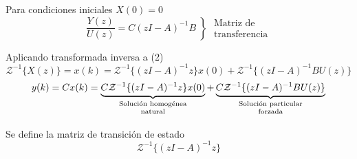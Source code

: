 Para condiciones iniciales \( X(0) = 0 \)
\[
    \frac{Y(z)}{U(z)} = C(zI-A)^{-1}B 
    \left\}
            \begin{array}{lll}
                \text{Matriz de} \\
                \text{transferencia}
            \end{array}
    \right.
\]

Aplicando transformada inversa a (2)
\[
    \mathcal{Z}^{-1} \{ X(z) \} = x(k) = \mathcal{Z}^{-1} \{ (zI-A)^{-1}z \}x(0) + \mathcal{Z}^{-1} \{ (zI-A)^{-1}BU(z) \}
\]
\[
    y(k) = Cx(k) = 
    \underbrace{
        C \mathcal{Z}^{-1} \{ (zI-A)^{-1}z \}x(0)
                }_
                {
                    \begin{scriptsize}
                        \begin{matrix}
                            \text{Solución homogénea} \\
                            \text{natural} \\
                        \end{matrix}
                    \end{scriptsize}
                }+ 
    \underbrace{
        C \mathcal{Z}^{-1} \{ (zI-A)^{-1}BU(z) \}
                }_
                {
                    \begin{scriptsize}
                        \begin{matrix}
                            \text{Solución particular} \\
                            \text{forzada} \\
                        \end{matrix}
                    \end{scriptsize}
                }
\]

Se define la matriz de transición de estado
\[
    \mathcal{Z}^{-1} \{ (zI-A)^{-1} z \}
\]